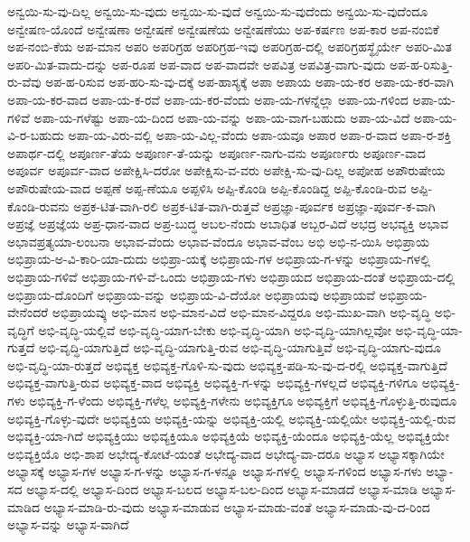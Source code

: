 {ಅನ್ವಯಿ-ಸು-ವು-ದಿಲ್ಲ
ಅನ್ವಯಿ-ಸು-ವುದು
ಅನ್ವಯಿ-ಸು-ವುದೆ
ಅನ್ವಯಿ-ಸು-ವುದೆಂದು
ಅನ್ವಯಿ-ಸು-ವುದೆಂದೂ
ಅನ್ವೇಷಣ-ಯೊಂದೆ
ಅನ್ವೇಷಣಾ
ಅನ್ವೇಷಣೆ
ಅನ್ವೇಷಣೆಯ
ಅನ್ವೇಷಣೆಯು
ಅಪ-ಕರ್ಷಣ
ಅಪ-ಕಾರ
ಅಪ-ನಂಬಿಕೆ
ಅಪ-ನಂಬಿ-ಕೆಯ
ಅಪ-ಮಾನ
ಅಪರಿ
ಅಪರಿಗ್ರಹ
ಅಪರಿಗ್ರಹ-ಇವು
ಅಪರಿಗ್ರಹ-ದಲ್ಲಿ
ಅಪರಿಗ್ರಹಸ್ಥೈರ್ಯೇ
ಅಪರಿ-ಮಿತ
ಅಪರಿ-ಮಿತ-ವಾದು-ದನ್ನು
ಅಪ-ರೂಪ
ಅಪ-ವಾದ
ಅಪ-ವಾದವೇ
ಅಪವಿತ್ರ
ಅಪವಿತ್ರ-ವಾಗು-ವುದು
ಅಪ-ಹ-ರಿಸುತ್ತಿ-ರು-ವೆವು
ಅಪ-ಹ-ರಿಸುವ
ಅಪ-ಹರಿ-ಸು-ವು-ದಕ್ಕೆ
ಅಪ-ಹಾಸ್ಯಕ್ಕೆ
ಅಪಾ
ಅಪಾಯ
ಅಪಾ-ಯ-ಕರ
ಅಪಾ-ಯ-ಕರ-ವಾಗಿ
ಅಪಾ-ಯ-ಕರ-ವಾದ
ಅಪಾ-ಯ-ಕ-ರವೆ
ಅಪಾ-ಯ-ಕರ-ವೆಂದು
ಅಪಾ-ಯ-ಗಳನ್ನೆಲ್ಲಾ
ಅಪಾ-ಯ-ಗಳಿಂದ
ಅಪಾ-ಯ-ಗಳಿವೆ
ಅಪಾ-ಯ-ಗಳೆಷ್ಟು
ಅಪಾ-ಯ-ದಿಂದ
ಅಪಾ-ಯ-ವನ್ನು
ಅಪಾ-ಯ-ವಾಗ-ಬಹುದು
ಅಪಾ-ಯ-ವಿದೆ
ಅಪಾ-ಯ-ವಿ-ರ-ಬಹುದು
ಅಪಾ-ಯ-ವಿರು-ವಲ್ಲಿ
ಅಪಾ-ಯ-ವಿಲ್ಲ-ವೆಂದು
ಅಪಾ-ಯವೂ
ಅಪಾರ
ಅಪಾ-ರ-ವಾದ
ಅಪಾ-ರ-ಶಕ್ತಿ
ಅಪಾರ್ಥ-ದಲ್ಲಿ
ಅಪೂರ್ಣ-ತೆಯ
ಅಪೂರ್ಣ-ತೆ-ಯನ್ನು
ಅಪೂರ್ಣ-ನಾಗು-ವನು
ಅಪೂರ್ಣರು
ಅಪೂರ್ಣ-ವಾದ
ಅಪೂರ್ವ
ಅಪೂರ್ವ-ವಾದ
ಅಪೇಕ್ಷಿಸಿ-ದರೋ
ಅಪೇಕ್ಷಿಸು-ವ-ವರು
ಅಪೇಕ್ಷಿ-ಸು-ವು-ದಿಲ್ಲ
ಅಪೋಹ
ಅಪೌರುಷೇಯ
ಅಪೌರುಷೇಯ-ವಾದ
ಅಪ್ಪಣೆ
ಅಪ್ಪ-ಣೆಯೂ
ಅಪ್ಪಳಿಸಿ
ಅಪ್ಪಿ-ಕೊಂಡಿ
ಅಪ್ಪಿ-ಕೊಂಡಿದ್ದ
ಅಪ್ಪಿ-ಕೊಂಡಿ-ರುವ
ಅಪ್ಪಿ-ಕೊಂಡಿ-ರುವನು
ಅಪ್ರಕ-ಟಿತ-ವಾಗಿ-ರಲಿ
ಅಪ್ರಕ-ಟಿತ-ವಾಗಿ-ರುತ್ತವೆ
ಅಪ್ರಜ್ಞಾ-ಪೂರ್ವಕ
ಅಪ್ರಜ್ಞಾ-ಪೂರ್ವ-ಕ-ವಾಗಿ
ಅಪ್ರಜ್ಞೆ
ಅಪ್ರಜ್ಞೆಯ
ಅಪ್ರ-ಧಾನ-ವಾದ
ಅಪ್ರ-ಬುದ್ಧ
ಅಬಲ-ನೆಂದು
ಅಬಾಧಿತ
ಅಬ್ಬರ-ವಿದೆ
ಅಭದ್ರ
ಅಭವ್ಯಕ್ತಿ
ಅಭಾವ
ಅಭಾವಪ್ರತ್ಯಯಾ-ಲಂಬನಾ
ಅಭಾವ-ವೆಂದು
ಅಭಾವ-ವೆಂದೂ
ಅಭಾವ-ವೆಂಬ
ಅಭಿ
ಅಭಿ-ನ-ಯಿಸಿ
ಅಭಿಪ್ರಾಯ
ಅಭಿಪ್ರಾಯ-ಅ-ವಿ-ಕಾರಿ-ಯಾ-ದುದು
ಅಭಿಪ್ರಾ-ಯಕ್ಕೆ
ಅಭಿಪ್ರಾಯ-ಗಳ
ಅಭಿಪ್ರಾಯ-ಗ-ಳನ್ನು
ಅಭಿಪ್ರಾಯ-ಗಳಲ್ಲಿ
ಅಭಿಪ್ರಾಯ-ಗಳಿವೆ
ಅಭಿಪ್ರಾಯ-ಗಳಿ-ವೆ-ಒಂದು
ಅಭಿಪ್ರಾಯ-ಗಳು
ಅಭಿಪ್ರಾಯದ
ಅಭಿಪ್ರಾಯ-ದಂತೆ
ಅಭಿಪ್ರಾಯ-ದಲ್ಲಿ
ಅಭಿಪ್ರಾಯ-ದೊಂದಿಗೆ
ಅಭಿಪ್ರಾಯ-ವನ್ನು
ಅಭಿಪ್ರಾಯ-ವಿ-ದೆಯೋ
ಅಭಿಪ್ರಾಯವು
ಅಭಿಪ್ರಾಯವೆ
ಅಭಿಪ್ರಾಯ-ವೇನೆಂದರೆ
ಅಭಿಪ್ರಾಯವ್ಕು
ಅಭಿ-ಮಾನ
ಅಭಿ-ಮಾನ-ವಿದೆ
ಅಭಿ-ಮಾನ-ವಿದ್ದರೂ
ಅಭಿ-ಮುಖ-ವಾಗಿ
ಅಭಿ-ವೃದ್ಧಿ
ಅಭಿ-ವೃದ್ಧಿಗೆ
ಅಭಿ-ವೃದ್ಧಿ-ಯಲ್ಲಿವೆ
ಅಭಿ-ವೃದ್ಧಿ-ಯಾಗ-ಬೇಕು
ಅಭಿ-ವೃದ್ಧಿ-ಯಾಗಿ
ಅಭಿ-ವೃದ್ಧಿ-ಯಾಗಿಲ್ಲವೋ
ಅಭಿ-ವೃದ್ಧಿ-ಯಾ-ಗುತ್ತದೆ
ಅಭಿ-ವೃದ್ಧಿ-ಯಾಗುತ್ತಿದೆ
ಅಭಿ-ವೃದ್ಧಿ-ಯಾಗುತ್ತಿ-ರುವ
ಅಭಿ-ವೃದ್ಧಿ-ಯಾಗುತ್ತಿವೆ
ಅಭಿ-ವೃದ್ಧಿ-ಯಾಗು-ವುದೂ
ಅಭಿ-ವೃದ್ಧಿ-ಯಾ-ರುತ್ತದೆ
ಅಭಿವ್ಯಕ್ತ
ಅಭಿವ್ಯಕ್ತ-ಗೊಳಿ-ಸು-ವುದು
ಅಭಿವ್ಯಕ್ತ-ಪಡಿ-ಸು-ವು-ದ-ರಲ್ಲಿ
ಅಭಿವ್ಯಕ್ತ-ವಾಗುತ್ತಿದೆ
ಅಭಿವ್ಯಕ್ತ-ವಾಗುತ್ತಿ-ರುವ
ಅಭಿವ್ಯಕ್ತ-ವಾದ
ಅಭಿವ್ಯಕ್ತಿ
ಅಭಿವ್ಯಕ್ತಿ-ಗ-ಳನ್ನು
ಅಭಿವ್ಯಕ್ತಿ-ಗಳಲ್ಲದೆ
ಅಭಿವ್ಯಕ್ತಿ-ಗಳಿಗೂ
ಅಭಿವ್ಯಕ್ತಿ-ಗಳು
ಅಭಿವ್ಯಕ್ತಿ-ಗ-ಳೆಂದು
ಅಭಿವ್ಯಕ್ತಿ-ಗಳೆಲ್ಲ
ಅಭಿವ್ಯಕ್ತಿ-ಗಳೇನು
ಅಭಿವ್ಯಕ್ತಿಗೂ
ಅಭಿವ್ಯಕ್ತಿಗೆ
ಅಭಿವ್ಯಕ್ತಿ-ಗೊಳ್ಳುತ್ತಿ-ರುವುದೂ
ಅಭಿವ್ಯಕ್ತಿ-ಗೊಳ್ಳು-ವುದೇ
ಅಭಿವ್ಯಕ್ತಿಯ
ಅಭಿವ್ಯಕ್ತಿ-ಯನ್ನು
ಅಭಿವ್ಯಕ್ತಿ-ಯಲ್ಲಿ
ಅಭಿವ್ಯಕ್ತಿ-ಯಲ್ಲಿಯೇ
ಅಭಿವ್ಯಕ್ತಿ-ಯಲ್ಲಿ-ರುವ
ಅಭಿವ್ಯಕ್ತಿ-ಯಾ-ಗಿದೆ
ಅಭಿವ್ಯಕ್ತಿಯು
ಅಭಿವ್ಯಕ್ತಿಯೂ
ಅಭಿವ್ಯಕ್ತಿಯೆ
ಅಭಿವ್ಯಕ್ತಿ-ಯೆಂದೂ
ಅಭಿವ್ಯಕ್ತಿ-ಯೆಲ್ಲ
ಅಭಿವ್ಯಕ್ತಿಯೇ
ಅಭಿವ್ಯಕ್ತಿಯೊ
ಅಭಿ-ಶಾಪ
ಅಭೇದ್ಯ-ಕೋಟೆ-ಯಂತೆ
ಅಭೇದ್ಯ-ವಾದ
ಅಭೇದ್ಯ-ವಾ-ದರೂ
ಅಭ್ಯಾಸ
ಅಭ್ಯಾಸಕ್ಕಾಗಿಯೇ
ಅಭ್ಯಾಸಕ್ಕೆ
ಅಭ್ಯಾಸ-ಗಳ
ಅಭ್ಯಾಸ-ಗ-ಳನ್ನು
ಅಭ್ಯಾಸ-ಗ-ಳನ್ನೂ
ಅಭ್ಯಾಸ-ಗಳಲ್ಲಿ
ಅಭ್ಯಾಸ-ಗಳಿಂದ
ಅಭ್ಯಾಸ-ಗಳು
ಅಭ್ಯಾ-ಸದ
ಅಭ್ಯಾಸ-ದಲ್ಲಿ
ಅಭ್ಯಾಸ-ದಿಂದ
ಅಭ್ಯಾಸ-ಬಲದ
ಅಭ್ಯಾಸ-ಬಲ-ದಿಂದ
ಅಭ್ಯಾಸ-ಮಾಡದೆ
ಅಭ್ಯಾಸ-ಮಾಡಿ
ಅಭ್ಯಾಸ-ಮಾಡಿದ
ಅಭ್ಯಾಸ-ಮಾಡಿ-ರು-ವುದು
ಅಭ್ಯಾಸ-ಮಾಡುವ
ಅಭ್ಯಾಸ-ಮಾಡು-ವಂತೆ
ಅಭ್ಯಾಸ-ಮಾಡು-ವು-ದ-ರಿಂದ
ಅಭ್ಯಾಸ-ವನ್ನು
ಅಭ್ಯಾಸ-ವಾಗಿದೆ
}
